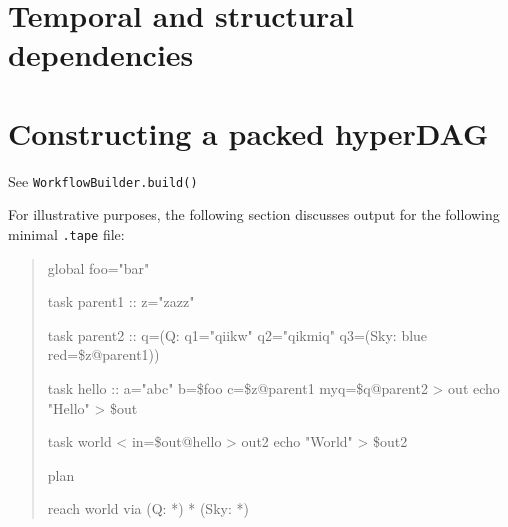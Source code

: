 \documentclass{report}
\begin{document}
\section{Temporal and structural dependencies}

\section{Constructing a packed hyperDAG}

See \texttt{WorkflowBuilder.build()} 

For illustrative purposes, the following section discusses output for the following minimal \texttt{.tape} file:

\begin{quotation}
	global {
		\quad foo="bar"
	}
	
	task parent1 :: z="zazz" {}
	
	task parent2 :: q=(Q: q1="qiikw" q2="qikmiq" q3=(Sky: blue red=\$z@parent1)) {}
	
	task hello :: a="abc" b=\$foo c=\$z@parent1 myq=\$q@parent2 > out {
		\quad echo "Hello" > \${out}
	}
	
	task world < in=\$out@hello > out2 {
		\quad echo "World" > \${out2}
	}
	
	plan {
	
		\quad reach world via (Q: *) * (Sky: *)
	
	}
\end{quotation}
\end{document}
